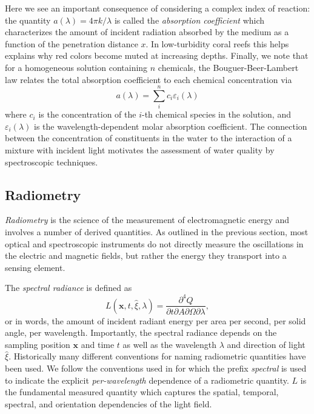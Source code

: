 Here we see an important consequence of considering a complex index of reaction:
the quantity $a(\lambda)=4\pi k/\lambda$ is called the \textit{absorption coefficient}
which characterizes the amount of incident radiation absorbed by the medium as a
function of the penetration distance $x$. In low-turbidity coral reefs this helps
explains why red colors become muted at increasing depths. Finally, we note that
for a homogeneous solution containing $n$ chemicals, the Bouguer-Beer-Lambert law
relates the total absorption coefficient to each chemical concentration via
\begin{equation}
  a(\lambda) = \sum_i^n c_i\varepsilon_i(\lambda)
\end{equation}
where $c_i$ is the concentration of the $i$-th chemical species in the solution,
and $\varepsilon_i(\lambda)$ is the wavelength-dependent molar absorption
coefficient. The connection between the concentration of constituents in the
water to the interaction of a mixture with incident light motivates the
assessment of water quality by spectroscopic techniques.

\subsection{Radiometry}

\textit{Radiometry} is the science of the measurement of electromagnetic energy
and involves a number of derived quantities. As outlined in the previous
section, most optical and spectroscopic instruments do not directly measure the
oscillations in the electric and magnetic fields, but rather the energy they
transport into a sensing element. 

The \textit{spectral radiance} is defined as
\begin{equation}
  L(\mathbf{x}, t, \hat{\xi}, \lambda) = \frac{\partial^4 Q}{\partial t \partial A \partial \Omega \partial \lambda},
\end{equation}
or in words, the amount of incident radiant energy per area per
second, per solid angle, per wavelength. Importantly, the spectral radiance
depends on the sampling position $\mathbf{x}$ and time $t$ as well as the wavelength
$\lambda$ and direction of light $\hat{\xi}$. Historically many different
conventions for naming radiometric quantities have been used. We follow the
conventions used in \cite{mobley-text} for which the prefix \textit{spectral} is
used to indicate the explicit \textit{per-wavelength} dependence of a
radiometric quantity. $L$ is the fundamental measured quantity which captures
the spatial, temporal, spectral, and orientation dependencies of the light field.

